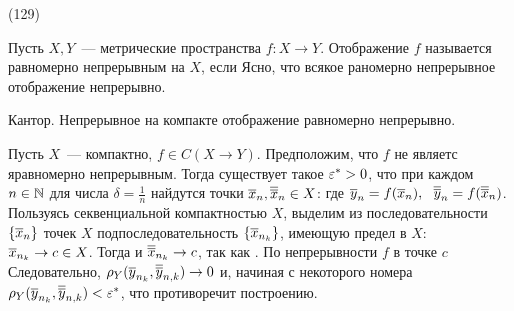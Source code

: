 (129)

\Op Пусть $X, Y$~--- метрические пространства $f: X\to Y$. Отображение $f$ называется равномерно непрерывным на $X$, если  Ясно, что всякое раномерно непрерывное отображение непрерывно.

\T \q Кантор. Непрерывное на компакте отображение равномерно непрерывно.

\D Пусть $X$~--- компактно, $f \in C(X \to Y)$. Предположим, что $f$ не являетс яравномерно непрерывным. Тогда существует такое $\varepsilon^* > 0$, что при каждом $n \in \mathbb{N}$ для числа $\delta = \frac 1n$ найдутся точки $\overline x_n, \overline{\overline{x}}_n \in X$:  где $\overline y_n = f(\overline x_n),\ \  \overline{\overline{y}}_n = f(\overline{\overline{x}}_n)$.\\
Пользуясь секвенциальной компактностью $X$, выделим из последовательности $\{\overline x_n\}$ точек $X$ подпоследовательность $\{\overline x_{n_k}\}$, имеющую предел в $X$: $\overline x_{n_k} \to c \in X$. Тогда и $\overline{\overline{x}}_{n_k} \to c$, так как . По непрерывности $f$ в точке $c$  Следовательно, $\rho_Y(\overline y_{n_k}, \overline{\overline{y}}_{n, k}) \to 0$ и, начиная с некоторого номера $\rho_Y(\overline y_{n_k}, \overline{\overline{y}}_{n, k}) < \varepsilon^*$, что противоречит построению.